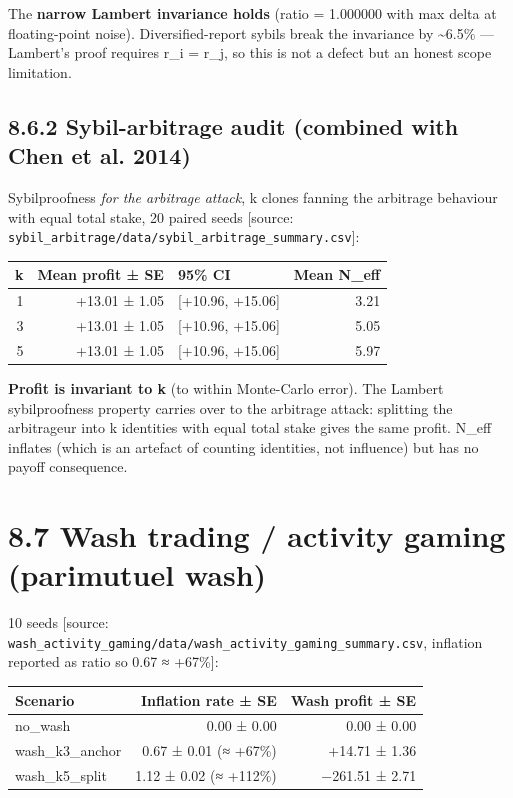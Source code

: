 \documentclass[11pt,a4paper,openany]{report}
\begin{document}
The \textbf{narrow Lambert invariance holds} (ratio = 1.000000 with max
delta at floating-point noise). Diversified-report sybils break the
invariance by \textasciitilde{}6.5\% — Lambert's proof requires r\_i = r\_j, so this
is not a defect but an honest scope limitation.

\subsection{8.6.2 Sybil-arbitrage audit (combined with Chen et al. 2014)}

Sybilproofness \emph{for the arbitrage attack}, k clones fanning the
arbitrage behaviour with equal total stake, 20 paired seeds [source:
\texttt{sybil\_arbitrage/data/sybil\_arbitrage\_summary.csv}]:

\begin{center}
\small
\begin{tabular}{rrlr}
\toprule
\textbf{k} & \textbf{Mean profit ± SE} & \textbf{95\% CI} & \textbf{Mean N\_eff} \\
\midrule
1 & +13.01 ± 1.05 & [+10.96, +15.06] & 3.21 \\
3 & +13.01 ± 1.05 & [+10.96, +15.06] & 5.05 \\
5 & +13.01 ± 1.05 & [+10.96, +15.06] & 5.97 \\
\bottomrule
\end{tabular}
\end{center}

\textbf{Profit is invariant to k} (to within Monte-Carlo error). The
Lambert sybilproofness property carries over to the arbitrage attack:
splitting the arbitrageur into k identities with equal total stake
gives the same profit. N\_eff inflates (which is an artefact of
counting identities, not influence) but has no payoff consequence.

\section{8.7 Wash trading / activity gaming (parimutuel wash)}

10 seeds [source:
\texttt{wash\_activity\_gaming/data/wash\_activity\_gaming\_summary.csv},
inflation reported as ratio so 0.67 ≈ +67\%]:

\begin{center}
\small
\begin{tabular}{lrr}
\toprule
\textbf{Scenario} & \textbf{Inflation rate ± SE} & \textbf{Wash profit ± SE} \\
\midrule
no\_wash & 0.00 ± 0.00 & 0.00 ± 0.00 \\
wash\_k3\_anchor & 0.67 ± 0.01 (≈ +67\%) & +14.71 ± 1.36 \\
wash\_k5\_split & 1.12 ± 0.02 (≈ +112\%) & −261.51 ± 2.71 \\
\bottomrule
\end{tabular}
\end{center}
\end{document}
